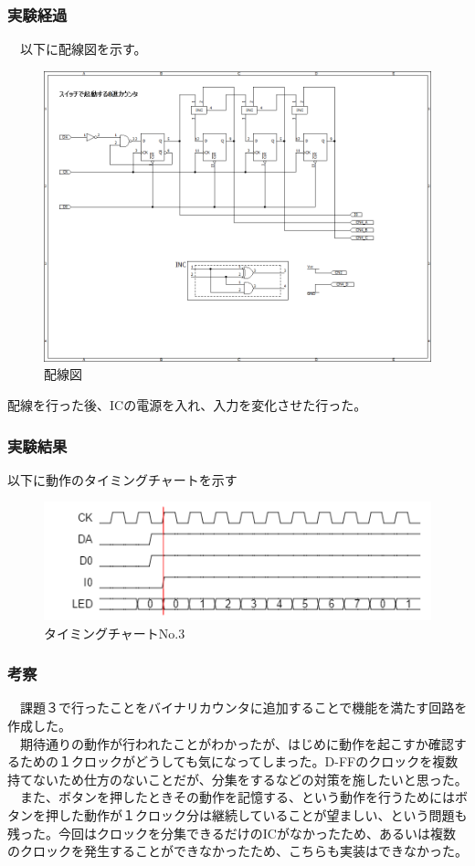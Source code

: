 \documentclass{scrartcl}
\begin{document}
\subsubsection{実験経過}
\label{sec:orgc3575ed}
　以下に配線図を示す。\\
\begin{figure}[htbp]
\centering
\includegraphics[width=.9\linewidth]{./logice-4.png}
\caption{\label{fig:orge37c5e3}
配線図}
\end{figure}
配線を行った後、ICの電源を入れ、入力を変化させた行った。\\
\subsubsection{実験結果}
\label{sec:org3b14328}
以下に動作のタイミングチャートを示す\\
\begin{figure}[htbp]
\centering
\includegraphics[width=.9\linewidth]{./logictime-4.png}
\caption{\label{fig:orgf0186d6}
タイミングチャートNo.3}
\end{figure}
\subsubsection{考察}
\label{sec:org29d19f3}
　課題３で行ったことをバイナリカウンタに追加することで機能を満たす回路を作成した。\\
　期待通りの動作が行われたことがわかったが、はじめに動作を起こすか確認するための１クロックがどうしても気になってしまった。D-FFのクロックを複数持てないため仕方のないことだが、分集をするなどの対策を施したいと思った。\\
　また、ボタンを押したときその動作を記憶する、という動作を行うためにはボタンを押した動作が１クロック分は継続していることが望ましい、という問題も残った。今回はクロックを分集できるだけのICがなかったため、あるいは複数のクロックを発生することができなかったため、こちらも実装はできなかった。\\
\end{document}
